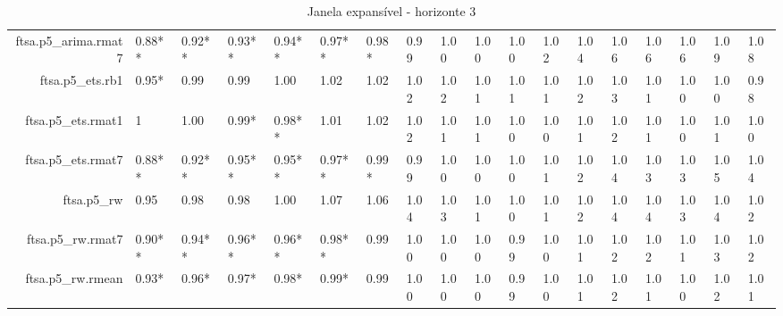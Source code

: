 \begin{table}[ht]
{\begin{tabular}{rlllllllllllllllll}
  ftsa.p5\_arima.rmat7 & 0.88** & 0.92** & 0.93** & 0.94** & 0.97** & 0.98* & 0.99 & 1.00 & 1.00 & 1.00 & 1.02 & 1.04 & 1.06 & 1.06 & 1.06 & 1.09 & 1.08 \\ 
  ftsa.p5\_ets.rb1 & 0.95* & 0.99 & 0.99 & 1.00 & 1.02 & 1.02 & 1.02 & 1.02 & 1.01 & 1.01 & 1.01 & 1.02 & 1.03 & 1.01 & 1.00 & 1.00 & 0.98 \\ 
  ftsa.p5\_ets.rmat1 & 1 & 1.00 & 0.99* & 0.98** & 1.01 & 1.02 & 1.02 & 1.01 & 1.01 & 1.00 & 1.00 & 1.01 & 1.02 & 1.01 & 1.00 & 1.01 & 1.00 \\ 
  ftsa.p5\_ets.rmat7 & 0.88** & 0.92** & 0.95** & 0.95** & 0.97** & 0.99* & 0.99 & 1.00 & 1.00 & 1.00 & 1.01 & 1.02 & 1.04 & 1.03 & 1.03 & 1.05 & 1.04 \\ 
  ftsa.p5\_rw & 0.95 & 0.98 & 0.98 & 1.00 & 1.07 & 1.06 & 1.04 & 1.03 & 1.01 & 1.00 & 1.01 & 1.02 & 1.04 & 1.04 & 1.03 & 1.04 & 1.02 \\ 
  ftsa.p5\_rw.rmat7 & 0.90** & 0.94** & 0.96** & 0.96** & 0.98** & 0.99 & 1.00 & 1.00 & 1.00 & 0.99 & 1.00 & 1.01 & 1.02 & 1.02 & 1.01 & 1.03 & 1.02 \\ 
  ftsa.p5\_rw.rmean & 0.93* & 0.96* & 0.97* & 0.98* & 0.99* & 0.99 & 1.00 & 1.00 & 1.00 & 0.99 & 1.00 & 1.01 & 1.02 & 1.01 & 1.00 & 1.02 & 1.01 \\ 
   \hline
\end{tabular}
}
\caption{Janela expansível - horizonte 3} 
\end{table}
